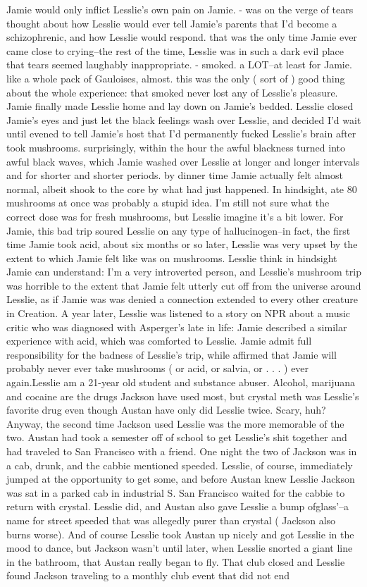 \documentclass[12pt]{book}
\begin{document}
Jamie would only inflict Lesslie's own pain on Jamie. - was on the verge of tears thought about how Lesslie would ever tell Jamie's parents that I'd become a schizophrenic, and how Lesslie would respond. that was the only time Jamie ever came close to crying--the rest of the time, Lesslie was in such a dark evil place that tears seemed laughably inappropriate. - smoked. a LOT--at least for Jamie. like a whole pack of Gauloises, almost. this was the only ( sort of ) good thing about the whole experience: that smoked never lost any of Lesslie's pleasure. Jamie finally made Lesslie home and lay down on Jamie's bedded. Lesslie closed Jamie's eyes and just let the black feelings wash over Lesslie, and decided I'd wait until evened to tell Jamie's host that I'd permanently fucked Lesslie's brain after took mushrooms. surprisingly, within the hour the awful blackness turned into awful black waves, which Jamie washed over Lesslie at longer and longer intervals and for shorter and shorter periods. by dinner time Jamie actually felt almost normal, albeit shook to the core by what had just happened. In hindsight, ate 80 mushrooms at once was probably a stupid idea. I'm still not sure what the correct dose was for fresh mushrooms, but Lesslie imagine it's a bit lower. For Jamie, this bad trip soured Lesslie on any type of hallucinogen--in fact, the first time Jamie took acid, about six months or so later, Lesslie was very upset by the extent to which Jamie felt like was on mushrooms. Lesslie think in hindsight Jamie can understand: I'm a very introverted person, and Lesslie's mushroom trip was horrible to the extent that Jamie felt utterly cut off from the universe around Lesslie, as if Jamie was was denied a connection extended to every other creature in Creation. A year later, Lesslie was listened to a story on NPR about a music critic who was diagnosed with Asperger's late in life: Jamie described a similar experience with acid, which was comforted to Lesslie. Jamie admit full responsibility for the badness of Lesslie's trip, while affirmed that Jamie will probably never ever take mushrooms ( or acid, or salvia, or . . .   ) ever again.Lesslie am a 21-year old student and substance abuser. Alcohol, marijuana and cocaine are the drugs Jackson have used most, but crystal meth was Lesslie's favorite drug even though Austan have only did Lesslie twice. Scary, huh? Anyway, the second time Jackson used Lesslie was the more memorable of the two. Austan had took a semester off of school to get Lesslie's shit together and had traveled to San Francisco with a friend. One night the two of Jackson was in a cab, drunk, and the cabbie mentioned speeded. Lesslie, of course, immediately jumped at the opportunity to get some, and before Austan knew Lesslie Jackson was sat in a parked cab in industrial S. San Francisco waited for the cabbie to return with crystal. Lesslie did, and Austan also gave Lesslie a bump ofglass'--a name for street speeded that was allegedly purer than crystal ( Jackson also burns worse). And of course Lesslie took Austan up nicely and got Lesslie in the mood to dance, but Jackson wasn't until later, when Lesslie snorted a giant line in the bathroom, that Austan really began to fly. That club closed and Lesslie found Jackson traveling to a monthly club event that did not end 
\end{document}
